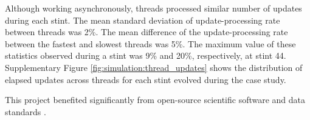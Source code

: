 Although working asynchronously, threads processed similar number of updates during each stint.
The mean standard deviation of update-processing rate between threads was 2\%.
The mean difference of the update-processing rate between the fastest and slowest threads was 5\%.
The maximum value of these statistics observed during a stint was 9\% and 20\%, respectively, at stint 44.
Supplementary Figure \ref{fig:simulation:thread_updates} shows the distribution of elapsed updates across threads for each stint evolved during the case study.

This project benefited significantly from open-source scientific software and data standards \citep{2020SciPy-NMeth,harris2020array,reback2020pandas,mckinney-proc-scipy-2010,waskom2021seaborn,hunter2007matplotlib,moreno2023teeplot,seabold2010statsmodels,vostinar2024empirical,moreno2021signalgp,10.1145/3449726.3463205,cock2009biopython,lalejini2019data}.
